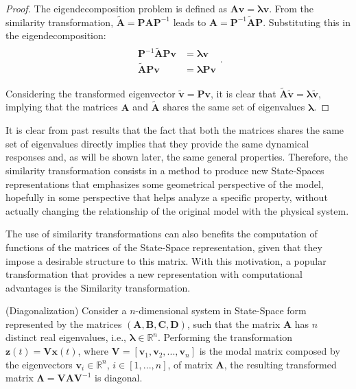 \documentclass[a4paper,11pt]{book}
\numberwithin{figure}{chapter}
\numberwithin{equation}{chapter}
\numberwithin{table}{chapter}
\newtheorem{theorem}{Theorem}[chapter]
\theoremstyle{definition}
\newcounter{boxed-theorem}
\newenvironment{boxed-theorem}[1]
{\begin{shaded} \begin{theorem}{#1}}
{\end{theorem} \end{shaded}}
\newcounter{boxed-definition}
\begin{document}
\begin{proof}
    The eigendecomposition problem is defined as $\bm{A} \bm{v} = \bm{\lambda} \bm{v}$. From the similarity transformation, $\tilde{\bm{A}} = \bm{P} \bm{A} \bm{P}^{-1}$ leads to $\bm{A} = \bm{P}^{-1} \tilde{\bm{A}} \bm{P}$. Substituting this in the eigendecomposition:
    \begin{align}
    \begin{split}
        \bm{P}^{-1} \tilde{\bm{A}} \bm{P} \bm{v} & = \bm{\lambda} \bm{v} \\
        \tilde{\bm{A}} \bm{P} \bm{v} & =  \bm{\lambda} \bm{P} \bm{v}
    \end{split}
    .\end{align}
   
    Considering the transformed eigenvector $\tilde{\bm{v}} = \bm{P} \bm{v}$, it is clear that $\tilde{\bm{A}} \tilde{\bm{v}} = \bm{\lambda} \tilde{\bm{v}}$, implying that the matrices $\bm{A}$ and $\tilde{\bm{A}}$ shares the same set of eigenvalues $\bm{\lambda}$.
\end{proof}

It is clear from past results that the fact that both the matrices shares the same set of eigenvalues directly implies that they provide the same dynamical responses and, as will be shown later, the same general properties. Therefore, the similarity transformation consists in a method to produce new State-Spaces representations that emphasizes some geometrical perspective of the model, hopefully in some perspective that helps analyze a specific property, without actually changing the relationship of the original model with the physical system.

The use of similarity transformations can also benefits the computation of functions of the matrices of the State-Space representation, given that they impose a desirable structure to this matrix. With this motivation, a popular transformation that provides a new representation with computational advantages is the Similarity transformation.

\begin{boxed-theorem}{(Diagonalization)}
    Consider a $n$-dimensional system in State-Space form represented by the matrices $(\bm{A}, \bm{B}, \bm{C}, \bm{D})$, such that the matrix $\bm{A}$ has $n$ distinct real eigenvalues, i.e., $\bm{\lambda} \in \mathbb{R}^n$. Performing the transformation $\bm{z}(t) = \bm{V} \bm{x}(t)$, where $\bm{V} = [\bm{v}_1, \bm{v}_2, ..., \bm{v}_n]$ is the modal matrix composed by the eigenvectors $\bm{v}_i \in \mathbb{R}^n$, $i \in [1, ..., n]$, of matrix $\bm{A}$, the resulting transformed matrix $\bm{\Lambda} = \bm{V} \bm{A} \bm{V}^{-1}$ is diagonal.
\end{boxed-theorem} 
\end{document}
